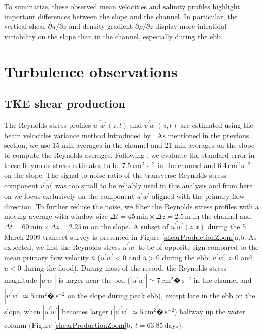 To summarize, these observed mean velocities and salinity profiles highlight important differences between the slope and the channel. In particular, the vertical shear $\partial u / \partial z$ and density gradient $\partial \rho / \partial z$ display more intratidal variability on the slope than in the channel, especially during the ebb.



\section{Turbulence observations}
\label{sectionTurbObs}

\subsection{TKE shear production}
\label{subsectionP}
The Reynolds stress profiles $\overline{u^{\prime} w^{\prime}}(z,t)$ and $\overline{v^{\prime} w^{\prime}}(z,t)$ are estimated using the beam velocities variance method introduced by \textcite{LOHRMANN:1990p5422}. As mentioned in the previous section, we use 15-min averages in the channel and 21-min averages on the slope to compute the Reynolds averages. Following \textcite{Stacey:1999p886}, we evaluate the standard error in these Reynolds stress estimates to be $7.5\, \mathrm{cm^{2}\,s^{-2}}$ in the channel and $6.4\, \mathrm{cm^{2}\,s^{-2}}$ on the slope. The signal to noise ratio of the transverse Reynolds stress component $\overline{v^{\prime} w^{\prime}}$ was too small to be reliably used in this analysis and from here on we focus exclusively on the component $\overline{u^{\prime} w^{\prime}}$ aligned with the primary flow direction. To further reduce the noise, we filter the Reynolds stress profiles with a moving-average with window size $\Delta t = 45\,\mathrm{min} \times \Delta z = 2.5 \, \mathrm{m}$ in the channel and $\Delta t = 60\,\mathrm{min} \times \Delta z = 2.25 \, \mathrm{m}$ on the slope. A subset of $\overline{u^{\prime} w^{\prime}}(z,t)$ during the 5 March 2009 transect survey is presented in Figure \ref{shearProductionZoom}a,b. As expected, we find the Reynolds stress  $\overline{u^{\prime} w^{\prime}}$ to be of opposite sign compared to the mean primary flow velocity $\overline{u}$ ($\overline{u^{\prime} w^{\prime}} < 0$ and $\overline{u} > 0$ during the ebb; $\overline{u^{\prime} w^{\prime}} > 0$ and $\overline{u} < 0$ during the flood). During most of the record, the Reynolds stress magnitude $\left| \overline{u^{\prime} w^{\prime}}\right|$ is larger near the bed ($\left| \overline{u^{\prime} w^{\prime}}\right| \simeq 7 \, \mathrm{cm^2�\, s^{-2}}$ in the channel and $\left| \overline{u^{\prime} w^{\prime}}\right| \simeq 5 \, \mathrm{cm^2�\, s^{-2}}$ on the slope during peak ebb), except late in the ebb on the slope, when $\left| \overline{u^{\prime} w^{\prime}}\right|$ becomes larger ($\left| \overline{u^{\prime} w^{\prime}}\right| \simeq 5 \, \mathrm{cm^2�\, s^{-2}}$) halfway up the water column (Figure \ref{shearProductionZoom}b, $t=63.85\,\mathrm{days}$).

